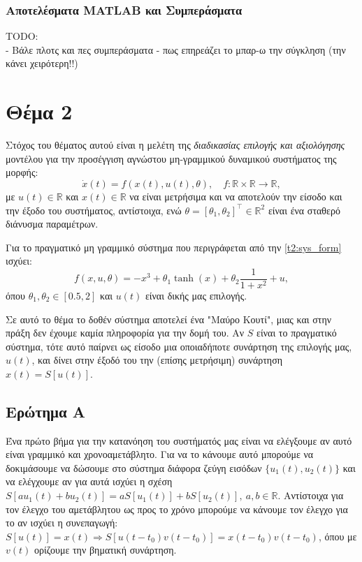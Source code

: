 \documentclass[12pt]{article} %
\numberwithin{equation}{section}  %
\begin{document}
\subsubsection{Αποτελέσματα MATLAB και Συμπεράσματα}
TODO: \\
- Βάλε πλοτς και πες συμπεράσματα
- πως επηρεάζει το μπαρ-ω την σύγκληση (την κάνει χειρότερη!!)\\



\newpage

\section{Θέμα 2}

Στόχος του θέματος αυτού είναι η μελέτη της \textit{διαδικασίας επιλογής και αξιολόγησης} μοντέλου 
για την προσέγγιση αγνώστου μη-γραμμικού δυναμικού συστήματος της μορφής:
\begin{equation}\label{t2:sys_form}
    \dot x (t) = f(x(t), u(t), \theta), \quad f: \mathbb{R} \times \mathbb{R} \rightarrow \mathbb{R}, 
\end{equation}
με $u(t) \in \mathbb{R}$ και $x(t)\in \mathbb{R}$ να είναι μετρήσιμα και να αποτελούν την είσοδο και την έξοδο του συστήματος, αντίστοιχα, ενώ
$\theta = [\theta_1, \theta_2]^{\top} \in \mathbb{R}^2$ είναι ένα σταθερό διάνυσμα παραμέτρων. 

Για το πραγματικό μη γραμμικό σύστημα που περιγράφεται από την \eqref{t2:sys_form} ισχύει:
\begin{equation}\label{t2:f_true}
    f(x, u, \theta) = - x^3 + \theta_1 \tanh(x) + \theta_2 \frac{1}{1 + x^2} + u, 
\end{equation}
όπου $\theta_1, \theta_2 \in [0.5, 2]$ και $u(t)$ είναι δικής μας επιλογής. 

Σε αυτό το θέμα το δοθέν σύστημα αποτελεί ένα "Μαύρο Κουτί", μιας και στην πράξη δεν έχουμε καμία πληροφορία για την δομή του. 
Αν $S$ είναι το πραγματικό σύστημα, τότε αυτό παίρνει ως είσοδο μια οποιαδήποτε συνάρτηση της επιλογής μας, $u(t)$, 
και δίνει στην έξοδό του την (επίσης μετρήσιμη) συνάρτηση $x(t) = S[u(t)]$.


\subsection{Ερώτημα Α}
Ένα πρώτο βήμα για την κατανόηση του συστήματός μας είναι να ελέγξουμε αν αυτό είναι γραμμικό και χρονοαμετάβλητο.
Για να το κάνουμε αυτό μπορούμε να δοκιμάσουμε να δώσουμε στο σύστημα διάφορα ζεύγη εισόδων $\{u_1(t), u_2(t)\}$
και να ελέγχουμε αν για αυτά ισχύει η σχέση $S[au_1(t) + bu_2(t)] = aS[u_1(t)] + bS[u_2(t)],\ a,b \in \mathbb{R}$.
Αντίστοιχα για τον έλεγχο του αμετάβλητου ως προς το χρόνο μπορούμε να κάνουμε τον έλεγχο για το αν ισχύει η συνεπαγωγή: 
$S[u(t)] = x(t) \Rightarrow S[u(t - t_0)v(t-t_0)] = x(t-t_0)v(t-t_0)$, όπου με $v(t)$ ορίζουμε την βηματική συνάρτηση. 
\end{document}
